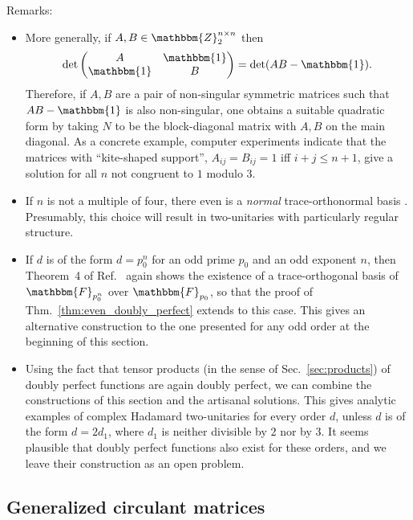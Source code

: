 \documentclass[aps,nofootinbib,floatfix,a4paper]{revtex4}
\newcommand{\1}{\mbox{$\mathbf{1}$}}
\def\ZZ{\mathbbm{Z}}
\def\FF{\mathbbm{F}}
\def\Id{\mathbbm{1}}
\begin{document}
Remarks:
\begin{itemize}
	\item
More generally, if $A, B\in\ZZ_2^{n\times n}$  then \cite{silvester2000determinants}
\begin{align*}
	\det
	\begin{pmatrix}
		A & \Id \\
		\Id & B
	\end{pmatrix}
	=
	\det(AB-\Id)
	.
\end{align*}
Therefore, if $A, B$ are a pair of non-singular symmetric matrices such that $AB-\Id$ is also non-singular, one obtains a suitable quadratic form by taking $N$ to be the block-diagonal matrix with $A, B$ on the main diagonal.
As a concrete example, computer experiments indicate that the matrices with ``kite-shaped support'', $A_{ij}=B_{ij}=1$ iff $i+j\leq n+1$, give a solution for all $n$ not congruent to $1$ modulo $3$. %
	\item
		If $n$ is not a multiple of four, there even is a \emph{normal} trace-orthonormal basis \cite[Result~1.6]{jungnickel1993trace}.
		Presumably, this choice will result in two-unitaries with particularly regular structure.
	\item
		If $d$ is of the form $d=p_0^n$ for an odd prime $p_0$ and an odd exponent $n$, 
		then Theorem~4 of Ref.~\cite{seroussi1980factorization} again shows the existence of a trace-orthogonal basis of $\FF_{p_0^n}$ over $\FF_{p_0}$, so that the proof of 
		Thm.~\ref{thm:even_doubly_perfect} extends to this case.
		This gives an alternative construction to the one presented for any odd order at the beginning of this section.
	\item
		Using the fact that tensor products 
		(in the sense of Sec.~\ref{sec:products}) of doubly perfect functions are again doubly perfect,
		we can combine the constructions of this section and the artisanal solutions.
		This gives analytic examples of complex Hadamard two-unitaries for every order $d$, 
		unless $d$ is of the form $d=2d_1$, where $d_1$ is neither divisible by $2$ nor by $3$.
		It seems plausible that doubly perfect functions also exist for these orders,
		and we leave their construction as an open problem.
\end{itemize}

\subsection{Generalized circulant matrices}
\label{sec:circulant}
\end{document}
